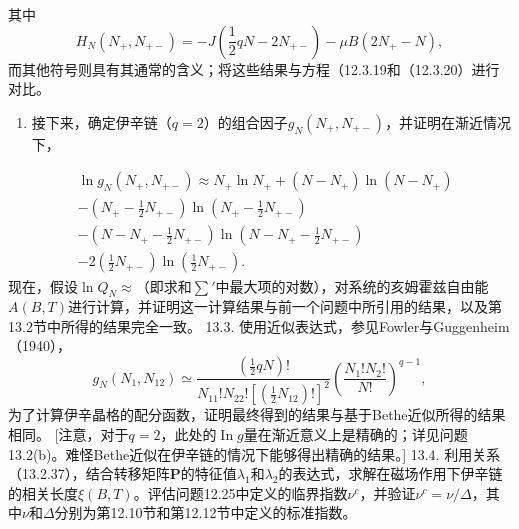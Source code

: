 其中
\begin{equation}\tag{13.7.16}\label{eq:13.7.16}
H _ { N } ( N _ { + } , N _ { + - } ) = - J \left( \frac { 1 } { 2 } q N - 2 N _ { + - } \right) - \mu B ( 2 N _ { + } - N ) ,
\end{equation}
而其他符号则具有其通常的含义；将这些结果与方程（12.3.19和（12.3.20）进行对比。
\begin{enumerate}
\def\labelenumi{(\alph{enumi})}
\setcounter{enumi}{1}
\item
  接下来，确定伊辛链（\(q=2\)）的组合因子\(g_{N}(N_{+},N_{+-})\)，并证明在渐近情况下，
\end{enumerate}
\begin{equation}\tag{13.7.17}\label{eq:13.7.17}
\begin{array}{rl} & { \ln g _ { N } ( N _ { + } , N _ { + - } ) \approx N _ { + } \ln N _ { + } + ( N - N _ { + } ) \ln ( N - N _ { + } ) } \\& {     - \left( N _ { + } - \frac { 1 } { 2 } N _ { + - } \right) \ln \left( N _ { + } - \frac { 1 } { 2 } N _ { + - } \right) } \\& {    - \left( N - N _ { + } - \frac { 1 } { 2 } N _ { + - } \right) \ln \left( N - N _ { + } - \frac { 1 } { 2 } N _ { + - } \right) } \\& {    - 2 \left( \frac { 1 } { 2 } N _ { + - } \right) \ln \left( \frac { 1 } { 2 } N _ { + - } \right) . } \end{array}
\end{equation}
现在，假设\(\ln Q_{N} \approx\)（即求和\(\sum'\)中最大项的对数），对系统的亥姆霍兹自由能\(A(B,T)\)进行计算，并证明这一计算结果与前一个问题中所引用的结果，以及第13.2节中所得的结果完全一致。
13.3. 使用近似表达式，参见Fowler与Guggenheim（1940），
\begin{equation}\tag{13.7.18}\label{eq:13.7.18}
g _ { N } ( N _ { 1 } , N _ { 12 } ) \simeq \frac { \left( \frac { 1 } { 2 } q N \right) ! } { N _ { 11 } ! N _ { 22 } ! \left[ \left( \frac { 1 } { 2 } N _ { 12 } \right) ! \right] ^{2} } \left( \frac { N _ { 1 } ! N _ { 2 } ! } { N ! } \right) ^{q - 1} ,
\end{equation}
为了计算伊辛晶格的配分函数，证明最终得到的结果与基于Bethe近似所得的结果相同。
{[}注意，对于\(q=2\)，此处的\(\operatorname{In}g\)量在渐近意义上是精确的；详见问题13.2(b)。难怪Bethe近似在伊辛链的情况下能够得出精确的结果。{]}
13.4. 利用关系（13.2.37），结合转移矩阵\(\boldsymbol{P}\)的特征值\(\lambda_{1}\)和\(\lambda_{2}\)的表达式，求解在磁场作用下伊辛链的相关长度\(\xi(B,T)\)。评估问题12.25中定义的临界指数\(\nu^{c}\)，并验证\(\nu^{c}=\nu/\Delta\)，其中\(\nu\)和\(\Delta\)分别为第12.10节和第12.12节中定义的标准指数。
